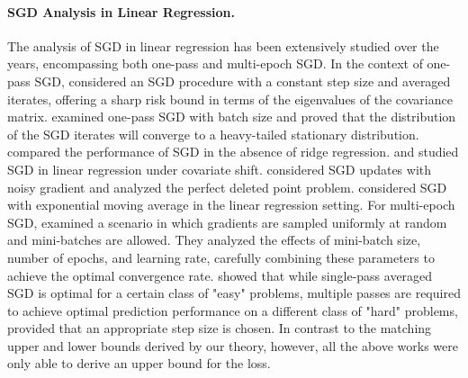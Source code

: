 \paragraph{SGD Analysis in Linear Regression.} %
The analysis of SGD in linear regression has been extensively studied over the years, encompassing both one-pass and multi-epoch SGD. In the context of one-pass SGD, \citet{zou2021benign,meterez2025simplified} considered an SGD procedure with a constant step size and averaged iterates, offering a sharp risk bound in terms of the eigenvalues of the covariance matrix. \citet{pmlr-v139-gurbuzbalaban21a} examined one-pass SGD with batch size and proved that the distribution of
the SGD iterates will converge to a heavy-tailed
stationary distribution. \citet{zou2022benefitsimplicitregularizationsgd} compared the performance of SGD in the absence of ridge regression. \citet{wu2022iterateriskboundssgd} and \citet{wu2022powerlimitationpretrainingfinetuninglinear} studied SGD in linear regression under covariate shift. \citet{xia2024data} considered SGD updates with noisy gradient and analyzed the perfect deleted point problem. \citet{li2025understanding} considered SGD with exponential moving average in the linear regression setting. For multi-epoch SGD, \citet{lin2019optimalratesmultipassstochastic} examined a scenario in which gradients are sampled uniformly at random and mini-batches are allowed. They analyzed the effects of mini-batch size, number of epochs, and learning rate, carefully combining these parameters to achieve the optimal convergence rate. \citet{pillaudvivien2018statisticaloptimalitystochasticgradient} showed that while single-pass averaged SGD is optimal for a certain class of "easy" problems, multiple passes are required to achieve optimal prediction performance on a different class of "hard" problems, provided that an appropriate step size is chosen. In contrast to the matching upper and lower bounds derived by our theory, however, all the above works were only able to derive an upper bound for the loss.